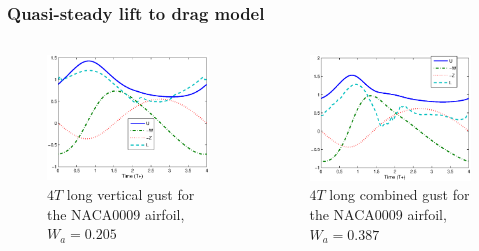 \documentclass[compress]{beamer}
\begin{document}
\begin{frame}
  \frametitle{Quasi-steady lift to drag model}
  \begin{columns}
    \begin{figure}
      \begin{center}
	\includegraphics[width=1\textwidth]{./Figures/Windtype=1_Tg=4_Wg=0p205_UAV_alphamax=12.eps}
      \end{center}
      \caption{$4T$ long vertical gust for the NACA0009 airfoil, $W_a=0.205$}
    \end{figure}
    \begin{figure}[h]
      \begin{center}
	\includegraphics[width=1\textwidth]{./Figures/Windtype=3_Tg=4_Wg=0p387_UAV_alphamax=12.eps}
      \end{center}
      \caption{$4T$ long combined gust for the NACA0009 airfoil, $W_a=0.387$}
    \end{figure}
  \end{columns} %
\end{frame}
\end{document}
